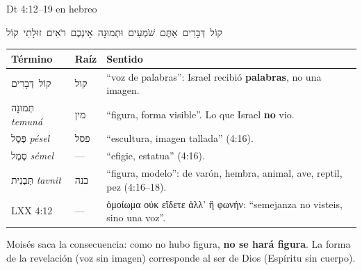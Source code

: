 \documentclass[hyperref={bookmarks=false},aspectratio=169]{beamer}
\newcommand{\heb}[1]{\mbox{\foreignlanguage{hebrew}{#1}}}
\newcommand{\grc}[1]{\foreignlanguage{ancientgreek}{#1}}
\newcommand{\destacar}[1]{\textbf{\textcolor{azul}{#1}}}
\begin{document}
\begin{frame}{Dt 4:12--19 en hebreo}
\begin{center}\heb{קוֹל דְּבָרִים אַתֶּם שֹׁמְעִים וּתְמוּנָה אֵינְכֶם רֹאִים זוּלָתִי קוֹל}\end{center}
\scriptsize\renewcommand{\arraystretch}{1.12}
\begin{tabular}{@{}>{\RaggedRight\arraybackslash}p{2.8cm}>{\RaggedRight\arraybackslash}p{1.1cm}>{\RaggedRight\arraybackslash}p{7.9cm}@{}}
\toprule
\textbf{Término} & \textbf{Raíz} & \textbf{Sentido} \\ \midrule
\heb{קוֹל דְּבָרִים} & \heb{קול} & ``voz de palabras'': Israel recibió \destacar{palabras}, no una imagen. \\
\heb{תְּמוּנָה} \emph{temuná} & \heb{מין} & ``figura, forma visible''. Lo que Israel \destacar{no} vio. \\
\heb{פֶּסֶל} \emph{pésel} & \heb{פסל} & ``escultura, imagen tallada'' (4:16). \\
\heb{סֶמֶל} \emph{sémel} & --- & ``efigie, estatua'' (4:16). \\
\heb{תַּבְנִית} \emph{tavnit} & \heb{בנה} & ``figura, modelo'': de varón, hembra, animal, ave, reptil, pez (4:16--18). \\
LXX 4:12 & --- & \grc{ὁμοίωμα οὐκ εἴδετε ἀλλ’ ἢ φωνήν}: ``semejanza no visteis, sino una voz''. \\
\bottomrule
\end{tabular}\par\medskip
\small\RaggedRight Moisés saca la consecuencia: como no hubo figura, \destacar{no se hará figura}. La forma de la revelación (voz sin imagen) corresponde al ser de Dios (Espíritu sin cuerpo).
\end{frame}
\end{document}

